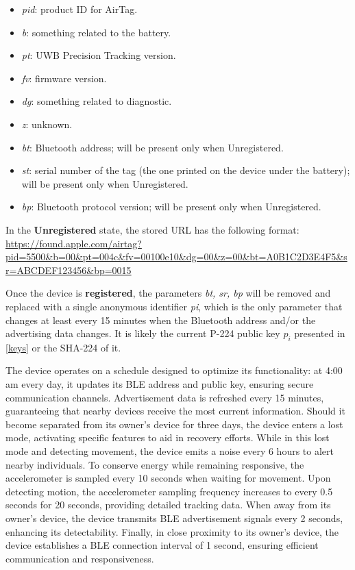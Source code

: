 \documentclass[english]{article}
\begin{document}
\begin{itemize}
  \item \textit{pid}: product ID for AirTag.
  \item \textit{b}: something related to the battery.
  \item \textit{pt}: UWB Precision Tracking version.
  \item \textit{fv}: firmware version.
  \item \textit{dg}: something related to diagnostic.
  \item \textit{z}: unknown.
  \item \textit{bt}: Bluetooth address; will be present only when Unregistered.
  \item \textit{st}: serial number of the tag (the one printed on the device under the battery); will be present only when Unregistered.
  \item \textit{bp}: Bluetooth protocol version; will be present only when Unregistered.
\end{itemize}
In the \textbf{Unregistered} state, the stored URL has the following format:
\url{https://found.apple.com/airtag?pid=5500&b=00&pt=004c&fv=00100e10&dg=00&z=00&bt=A0B1C2D3E4F5&sr=ABCDEF123456&bp=0015}

Once the device is \textbf{registered}, the parameters \textit{bt, sr, bp} will be removed and replaced with a single anonymous identifier \textit{pi}, which is the only parameter that changes at least every 15 minutes when the Bluetooth address and/or the advertising data changes. It is likely the current P-224 public key $p_i$ presented in \ref{keys} or the SHA-224 of it. 


The device operates on a schedule designed to optimize its functionality:
at 4:00 am every day, it updates its BLE address and public key, ensuring secure communication channels.
Advertisement data is refreshed every 15 minutes, guaranteeing that nearby devices receive the most current information.
Should it become separated from its owner's device for three days, the device enters a lost mode, activating specific features to aid in recovery efforts.
While in this lost mode and detecting movement, the device emits a noise every 6 hours to alert nearby individuals.
To conserve energy while remaining responsive, the accelerometer is sampled every 10 seconds when waiting for movement.
Upon detecting motion, the accelerometer sampling frequency increases to every 0.5 seconds for 20 seconds, providing detailed tracking data.
When away from its owner's device, the device transmits BLE advertisement signals every 2 seconds, enhancing its detectability.
Finally, in close proximity to its owner's device, the device establishes a BLE connection interval of 1 second, ensuring efficient communication and responsiveness.
\end{document}
